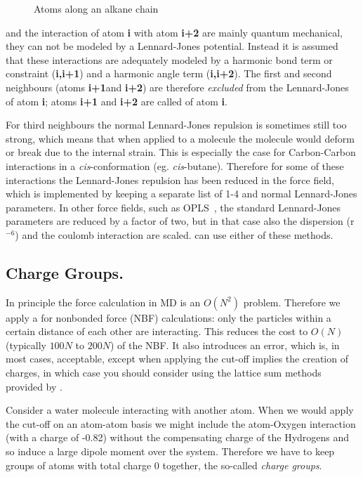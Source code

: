 \begin{figure}
\centerline{}
\caption{Atoms along an alkane chain}
\label{fig:chain}
\end{figure}

and the interaction of atom {\bf i} with atom {\bf i+2} are mainly
quantum mechanical, they can not be modeled by a Lennard-Jones potential.
Instead it is assumed that these interactions are adequately modeled
by a harmonic bond term or constraint ({\bf i,i+1}) and a harmonic angle term
({\bf i,i+2}). The first and second neighbours (atoms {\bf i+1}and {\bf i+2}) 
are therefore
{\em excluded} from the Lennard-Jones  
of atom {\bf i};
atoms {\bf i+1} and {\bf i+2} are called {\em {}} of atom {\bf i}.

For third neighbours the normal Lennard-Jones repulsion is sometimes
still too strong, which means that when applied to a molecule the
molecule would deform or break due to the internal strain. This is
especially the case for Carbon-Carbon interactions in a {\em
cis}-conformation (eg. {\em cis}-butane).  Therefore for some of these
interactions the Lennard-Jones repulsion has been reduced in the
{\gromos} force field, which is implemented by keeping a separate list of
1-4 and normal Lennard-Jones parameters. In other force fields, such
as OPLS~\cite{Jorgensen88}, the standard Lennard-Jones parameters are reduced
by a factor of two, but in that case also the dispersion (r$^{-6}$)
and the coulomb interaction are scaled.
{\gromacs} can use either of these methods.

\subsection{Charge Groups.}
\label{sec:cg}
In principle the force calculation in MD is an $O(N^2)$ problem. 
Therefore we apply a  
for nonbonded force (NBF) calculations:
only the particles within a certain distance of each other
are interacting. This reduces the cost to $O(N)$ (typically
$100N$ to $200N$) of the NBF. It also introduces an error,
which is, in most cases, acceptable, except when applying the cut-off
implies the creation of charges, in which case you should consider 
using the lattice sum methods provided by {\gromacs}.

Consider a water molecule interacting with another atom. When we would apply
the cut-off on an atom-atom basis we might include the atom-Oxygen
interaction (with a charge of -0.82) without the compensating charge
of the Hydrogens and so induce a large dipole moment over the system.
Therefore we have to keep groups of atoms with total charge
0 together, the so-called {\em charge groups}.

